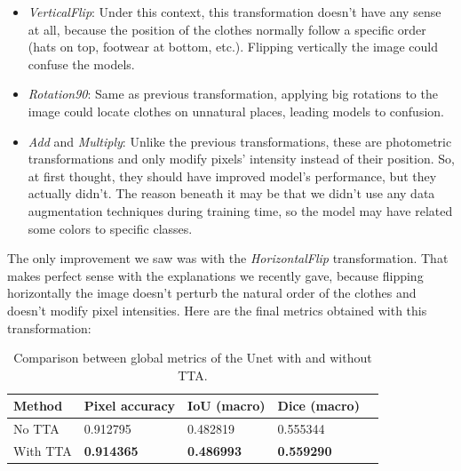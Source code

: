 \documentclass[12pt,a4paper]{article}
\begin{document}
\begin{itemize}
    \item \textit{VerticalFlip}: Under this context, this transformation doesn't have any sense at all, because the position of the clothes normally follow a specific order (hats on top, footwear at bottom, etc.). Flipping vertically the image could confuse the models.
    \item \textit{Rotation90}: Same as previous transformation, applying big rotations to the image could locate clothes on unnatural places, leading models to confusion.
    \item \textit{Add} and \textit{Multiply}: Unlike the previous transformations, these are photometric transformations and only modify pixels' intensity instead of their position. So, at first thought, they should have improved model's performance, but they actually didn't. The reason beneath it may be that we didn't use any data augmentation techniques during training time, so the model may have related some colors to specific classes.
\end{itemize}

The only improvement we saw was with the \textit{HorizontalFlip} transformation. That makes perfect sense with the explanations we recently gave, because flipping horizontally the image doesn't perturb the natural order of the clothes and doesn't modify pixel intensities. Here are the final metrics obtained with this transformation:

\begin{table}[H]
\scriptsize
\begin{tabularx}{\textwidth}{llXXX}
\toprule
\textbf{Method} & \textbf{Pixel accuracy} & \textbf{IoU (macro)} & \textbf{Dice (macro)} \\
\midrule
No TTA & 0.912795 & 0.482819 & 0.555344 \\
With TTA & \textbf{0.914365} & \textbf{0.486993} & \textbf{0.559290} \\
\bottomrule
\end{tabularx}
\caption{Comparison between global metrics of the Unet with and without TTA.}
\label{tab:unet_tta_glob_metrics}
\end{table}
\end{document}

